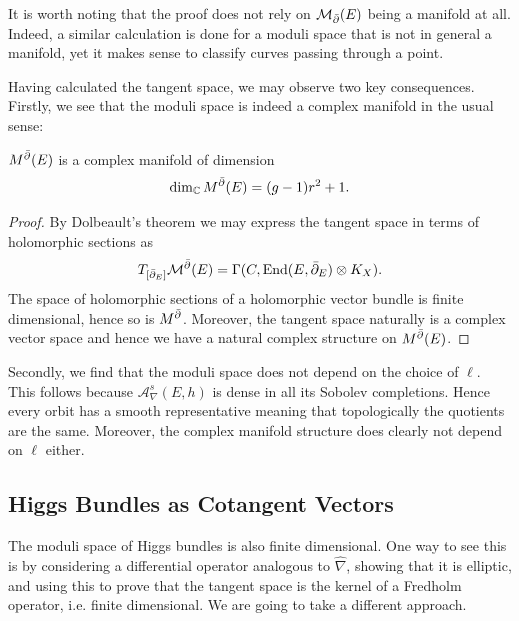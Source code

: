 \documentclass[12pt]{ociamthesis}  %
\begin{document}
It is worth noting that the proof does not rely on $\mathcal M_{\bar{\partial}}(E)$ being a manifold
at all. Indeed, a similar calculation is done for a moduli space that is not
in general a manifold, yet it makes sense to classify curves passing through a point.

Having calculated the tangent space, we may observe two key consequences.
Firstly, we see that the moduli space is indeed a complex manifold in the usual sense:

\begin{corollary}
  $M^{\bar{\partial}}(E)$ is a complex manifold of dimension
  \begin{align*}
    \dim_{\mathbb{C}} M^{\bar{\partial}}(E) = (g-1)r^2 + 1.
  \end{align*}
  \begin{proof}
    By Dolbeault's theorem we may express the tangent space in terms of holomorphic
    sections as
    \begin{align*}
      T_{[{\bar{\partial}}_E]}\mathcal M^{\bar{\partial}}(E) = \Gamma(C,\operatorname{End}(E,{\bar{\partial}}_E) \otimes K_X).
    \end{align*}
    The space of holomorphic sections of a holomorphic vector bundle is finite dimensional,
    hence so is $M^{\bar{\partial}}$. Moreover, the tangent space naturally is a complex vector
    space and hence we have a natural complex structure on $M^{\bar{\partial}}(E)$.

  \end{proof}
\end{corollary}

Secondly, we find that the moduli space does not depend on the
choice of $\ell$. This follows because $\mathcal A_\nabla^{s}(E,h)$
is dense in all its Sobolev completions. Hence every orbit has a
smooth representative meaning that topologically the quotients are
the same. Moreover, the complex manifold structure does clearly
not depend on $\ell$ either.

\subsection{Higgs Bundles as Cotangent Vectors}

The moduli space of Higgs bundles is also finite dimensional. One way to
see this is by considering a differential operator analogous to $\hat\nabla$,
showing that it is elliptic, and using this to prove that the
tangent space is the kernel of a Fredholm operator, i.e. finite
dimensional. We are going to take a different approach.
\end{document}
